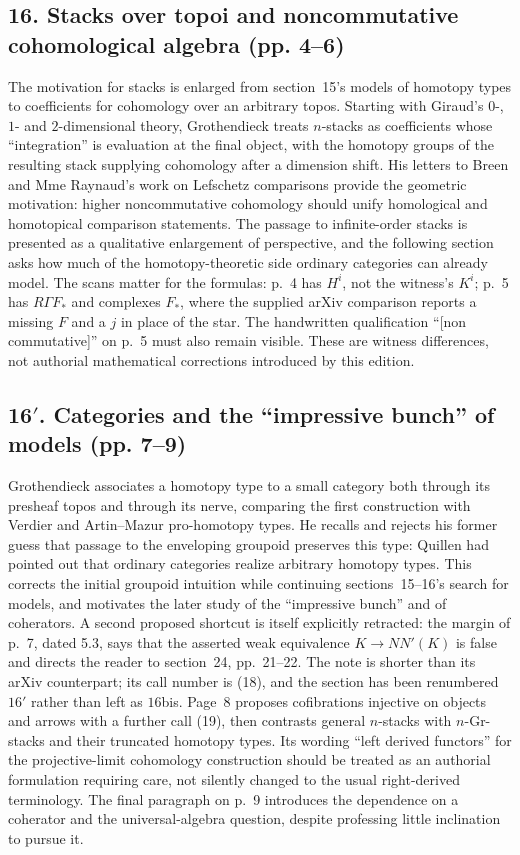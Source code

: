 \documentclass[10pt,oneside]{book}
\begin{document}
\subsection*{16. Stacks over topoi and noncommutative cohomological algebra (pp. 4--6)}
The motivation for stacks is enlarged from section~15's models of homotopy types to coefficients for cohomology over an arbitrary topos. Starting with Giraud's $0$-, $1$- and $2$-dimensional theory, Grothendieck treats $n$-stacks as coefficients whose ``integration'' is evaluation at the final object, with the homotopy groups of the resulting stack supplying cohomology after a dimension shift. His letters to Breen and Mme Raynaud's work on Lefschetz comparisons provide the geometric motivation: higher noncommutative cohomology should unify homological and homotopical comparison statements. The passage to infinite-order stacks is presented as a qualitative enlargement of perspective, and the following section asks how much of the homotopy-theoretic side ordinary categories can already model. The scans matter for the formulas: p.~4 has $H^i$, not the witness's $K^i$; p.~5 has $R\Gamma F_*$ and complexes $F_*$, where the supplied arXiv comparison reports a missing $F$ and a $j$ in place of the star. The handwritten qualification ``[non commutative]'' on p.~5 must also remain visible. These are witness differences, not authorial mathematical corrections introduced by this edition.

\subsection*{16$'$. Categories and the ``impressive bunch'' of models (pp. 7--9)}
Grothendieck associates a homotopy type to a small category both through its presheaf topos and through its nerve, comparing the first construction with Verdier and Artin--Mazur pro-homotopy types. He recalls and rejects his former guess that passage to the enveloping groupoid preserves this type: Quillen had pointed out that ordinary categories realize arbitrary homotopy types. This corrects the initial groupoid intuition while continuing sections~15--16's search for models, and motivates the later study of the ``impressive bunch'' and of coherators. A second proposed shortcut is itself explicitly retracted: the margin of p.~7, dated 5.3, says that the asserted weak equivalence $K\longrightarrow NN'(K)$ is false and directs the reader to section~24, pp.~21--22. The note is shorter than its arXiv counterpart; its call number is (18), and the section has been renumbered $16'$ rather than left as $16$bis. Page~8 proposes cofibrations injective on objects and arrows with a further call (19), then contrasts general $n$-stacks with $n$-Gr-stacks and their truncated homotopy types. Its wording ``left derived functors'' for the projective-limit cohomology construction should be treated as an authorial formulation requiring care, not silently changed to the usual right-derived terminology. The final paragraph on p.~9 introduces the dependence on a coherator and the universal-algebra question, despite professing little inclination to pursue it.
\end{document}
